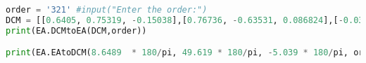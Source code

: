 \begin{lstlisting}[language=python, caption= EA.py]
order = '321' #input("Enter the order:")
DCM = [[0.6405, 0.75319, -0.15038],[0.76736, -0.63531, 0.086824],[-0.030154, -0.17101, -0.98481]]
print(EA.DCMtoEA(DCM,order))

print(EA.EAtoDCM(8.6489  * 180/pi, 49.619 * 180/pi, -5.039 * 180/pi, order))
\end{lstlisting}